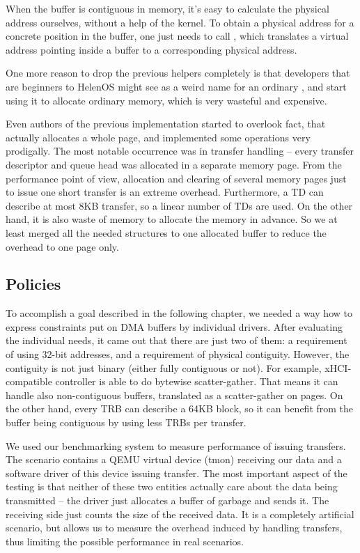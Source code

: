 When the buffer is contiguous in memory, it's easy to calculate the physical
address ourselves, without a help of the kernel. To obtain a physical address
for a concrete position in the buffer, one just needs to call
, which translates a virtual address pointing inside
a buffer to a corresponding physical address.

One more reason to drop the previous  helpers completely is that
developers that are beginners to HelenOS might see  as a weird
name for an ordinary , and start using it to allocate ordinary
memory, which is very wasteful and expensive.

Even authors of the previous implementation started to overlook fact, that
 actually allocates a whole page, and implemented some operations
very prodigally. The most notable occurrence was in transfer handling -- every
transfer descriptor and queue head was allocated in a separate memory page.
From the performance point of view, allocation and clearing of several memory
pages just to issue one short transfer is an extreme overhead. Furthermore,
a TD can describe at most 8KB transfer, so a linear number of TDs are used.
On the other hand, it is also waste of memory to allocate the memory in
advance. So we at least merged all the needed structures to one allocated
buffer to reduce the overhead to one page only.


\subsection{Policies}

To accomplish a goal described in the following chapter, we needed a way how to
express constraints put on DMA buffers by individual drivers. After evaluating
the individual needs, it came out that there are just two of them:
a requirement of using 32-bit addresses, and a requirement of physical
contiguity. However, the contiguity is not just binary (either fully contiguous
or not). For example, xHCI-compatible controller is able to do bytewise
scatter-gather. That means it can handle also non-contiguous buffers,
translated as a scatter-gather on pages. On the other hand, every TRB can
describe a 64KB block, so it can benefit from the buffer being contiguous by
using less TRBs per transfer.

We used our benchmarking system to measure performance of issuing transfers.
The scenario contains a QEMU virtual device (tmon) receiving our data and
a software driver of this device issuing transfer. The most important aspect of
the testing is that neither of these two entities actually care about the data
being transmitted -- the driver just allocates a buffer of garbage and sends
it. The receiving side just counts the size of the received data. It is
a completely artificial scenario, but allows us to measure the overhead induced
by handling transfers, thus limiting the possible performance in real scenarios.


